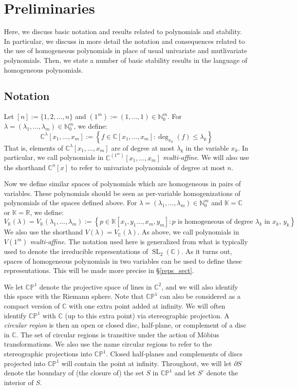 \documentclass{article}
\theoremstyle{definition}
\theoremstyle{plain}
\newcommand{\C}{\mathbb{C}}
\newcommand{\R}{\mathbb{R}}
\newcommand{\N}{\mathbb{N}}
\newcommand{\K}{\mathbb{K}}
\newcommand{\CP}{\mathbb{CP}}
\DeclareMathOperator{\SL}{SL}
\begin{document}
\section{Preliminaries}\label{prelim_sect}

Here, we discuss basic notation and results related to polynomials and stability. In particular, we discuss in more detail the notation and consequences related to the use of homogeneous polynomials in place of usual univariate and mutlivariate polynomials. Then, we state a number of basic stability results in the language of homogeneous polynomials.

\subsection{Notation}

Let $[n] := \{1,2,\ldots,n\}$ and $(1^m) := (1,\ldots,1) \in \N_0^m$. For $\lambda = (\lambda_1,\ldots,\lambda_m) \in \N_0^m$, we define:
\[
    \C^\lambda[x_1,\ldots,x_m] := \left\{f \in \C[x_1,\ldots,x_m] : \deg_{x_k}(f) \leq \lambda_k\right\}
\]
That is, elements of $\C^\lambda[x_1,\ldots,x_m]$ are of degree at most $\lambda_k$ in the variable $x_k$. In particular, we call polynomials in $\C^{(1^m)}[x_1,\ldots,x_m]$ \emph{multi-affine}. We will also use the shorthand $\C^n[x]$ to refer to univariate polynomials of degree at most $n$.

Now we define similar spaces of polynomials which are homogeneous in pairs of variables. These polynomials should be seen as per-variable homogenizations of polynomials of the spaces defined above. For $\lambda = (\lambda_1,\ldots,\lambda_m) \in \N_0^m$ and $\K = \C$ or $\K = \R$, we define:
\[
    V_\K(\lambda) = V_\K(\lambda_1,\ldots,\lambda_m) := \left\{p \in \K[x_1,y_1\ldots,x_m,y_m] : p \text{ is homogeneous of degree $\lambda_k$ in $x_k$, $y_k$}\right\}
\]
We also use the shorthand $V(\lambda) = V_\C(\lambda)$. As above, we call polynomials in $V(1^m)$ \emph{multi-affine}. The notation used here is generalized from what is typically used to denote the irreducible representations of $\SL_2(\C)$. As it turns out, spaces of homogeneous polynomials in two variables can be used to define these representations. This will be made more precise in \S\ref{reps_sect}.

We let $\CP^1$ denote the projective space of lines in $\C^2$, and we will also identify this space with the Riemann sphere. Note that $\CP^1$ can also be considered as a compact version of $\C$ with one extra point added at infinity. We will often identify $\CP^1$ with $\C$ (up to this extra point) via stereographic projection. A \emph{circular region} is then an open or closed disc, half-plane, or complement of a disc in $\C$. The set of circular regions is transitive under the action of M\"obius transformations. We also use the name circular regions to refer to the stereographic projections into $\CP^1$. Closed half-planes and complements of discs projected into $\CP^1$ will contain the point at infinity. Throughout, we will let $\partial S$ denote the boundary of (the closure of) the set $S$ in $\CP^1$ and let $S^\circ$ denote the interior of $S$.
\end{document}
